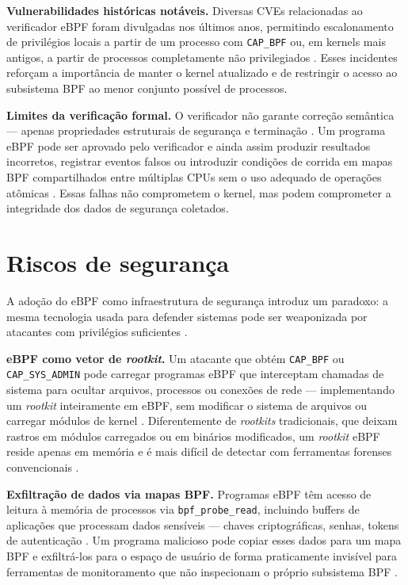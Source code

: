 \textbf{Vulnerabilidades históricas notáveis.}
Diversas CVEs relacionadas ao verificador eBPF foram divulgadas nos últimos anos,
permitindo escalonamento de privilégios locais a partir de um processo com
\texttt{CAP\_BPF} ou, em kernels mais antigos, a partir de processos completamente
não privilegiados \cite{linuxkernel2024,gregg2020}.
Esses incidentes reforçam a importância de manter o kernel atualizado e de
restringir o acesso ao subsistema BPF ao menor conjunto possível de processos.

\textbf{Limites da verificação formal.}
O verificador não garante correção semântica — apenas propriedades estruturais de
segurança e terminação \cite{linuxkernel2024}.
Um programa eBPF pode ser aprovado pelo verificador e ainda assim produzir
resultados incorretos, registrar eventos falsos ou introduzir condições de corrida
em mapas BPF compartilhados entre múltiplas CPUs sem o uso adequado de operações
atômicas \cite{gregg2019}.
Essas falhas não comprometem o kernel, mas podem comprometer a integridade dos
dados de segurança coletados.

\section{Riscos de segurança}

A adoção do eBPF como infraestrutura de segurança introduz um paradoxo: a mesma
tecnologia usada para defender sistemas pode ser weaponizada por atacantes com
privilégios suficientes \cite{gregg2020}.

\textbf{eBPF como vetor de \textit{rootkit}.}
Um atacante que obtém \texttt{CAP\_BPF} ou \texttt{CAP\_SYS\_ADMIN} pode carregar
programas eBPF que interceptam chamadas de sistema para ocultar arquivos, processos
ou conexões de rede — implementando um \textit{rootkit} inteiramente em eBPF, sem
modificar o sistema de arquivos ou carregar módulos de kernel \cite{gregg2019}.
Diferentemente de \textit{rootkits} tradicionais, que deixam rastros em módulos
carregados ou em binários modificados, um \textit{rootkit} eBPF reside apenas em
memória e é mais difícil de detectar com ferramentas forenses convencionais
\cite{majors2022}.

\textbf{Exfiltração de dados via mapas BPF.}
Programas eBPF têm acesso de leitura à memória de processos via
\texttt{bpf\_probe\_read}, incluindo buffers de aplicações que processam dados
sensíveis — chaves criptográficas, senhas, tokens de autenticação \cite{gregg2019}.
Um programa malicioso pode copiar esses dados para um mapa BPF e exfiltrá-los
para o espaço de usuário de forma praticamente invisível para ferramentas de
monitoramento que não inspecionam o próprio subsistema BPF \cite{linuxkernel2024}.

